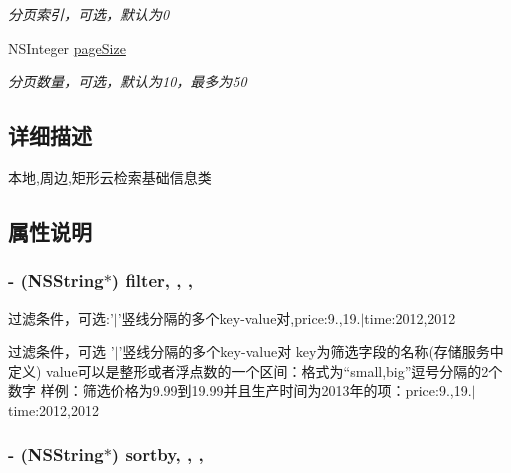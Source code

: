 \begin{DoxyCompactItemize}
\begin{DoxyCompactList}\small\item\em 分页索引，可选，默认为0 \end{DoxyCompactList}\item 
\hypertarget{interface_b_m_k_cloud_search_info_ab625992f8620205a6b24a1490a999fde}{N\+S\+Integer \hyperlink{interface_b_m_k_cloud_search_info_ab625992f8620205a6b24a1490a999fde}{page\+Size}}\label{interface_b_m_k_cloud_search_info_ab625992f8620205a6b24a1490a999fde}

\begin{DoxyCompactList}\small\item\em 分页数量，可选，默认为10，最多为50 \end{DoxyCompactList}\end{DoxyCompactItemize}


\subsection{详细描述}
本地,周边,矩形云检索基础信息类 

\subsection{属性说明}
\hypertarget{interface_b_m_k_cloud_search_info_a65d91501d19f2a6aa027de6f9e5bc837}{
\subsubsection[{filter}]{\setlength{\rightskip}{0pt plus 5cm}-\/ (N\+S\+String$\ast$) filter\hspace{0.3cm}{\ttfamily [read]}, {\ttfamily [write]}, {\ttfamily [nonatomic]}, {\ttfamily [strong]}}}\label{interface_b_m_k_cloud_search_info_a65d91501d19f2a6aa027de6f9e5bc837}


过滤条件，可选\+:'$\vert$'竖线分隔的多个key-\/value对,price\+:9.,19.$\vert$time\+:2012,2012 

过滤条件，可选 '$\vert$'竖线分隔的多个key-\/value对 key为筛选字段的名称(存储服务中定义) value可以是整形或者浮点数的一个区间：格式为“small,big”逗号分隔的2个数字 样例：筛选价格为9.99到19.99并且生产时间为2013年的项：price\+:9.,19.$\vert$time\+:2012,2012 \hypertarget{interface_b_m_k_cloud_search_info_ab0d42d1b9e841c5e538e457e819a07f7}{
\subsubsection[{sortby}]{\setlength{\rightskip}{0pt plus 5cm}-\/ (N\+S\+String$\ast$) sortby\hspace{0.3cm}{\ttfamily [read]}, {\ttfamily [write]}, {\ttfamily [nonatomic]}, {\ttfamily [strong]}}}\label{interface_b_m_k_cloud_search_info_ab0d42d1b9e841c5e538e457e819a07f7}


